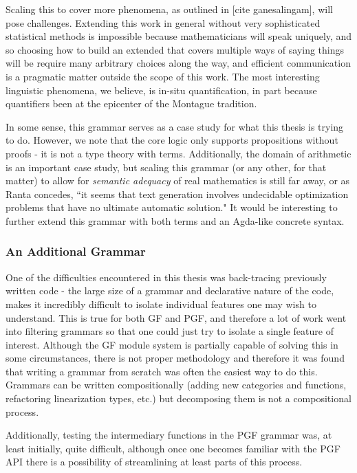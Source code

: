 Scaling this to cover more phenomena, as outlined in [cite ganesalingam], will
pose challenges. Extending this work in general without very sophisticated
statistical methods is impossible because mathematicians will speak uniquely,
and so choosing how to build an extended that covers multiple ways of saying
things will be require many arbitrary choices along the way, and efficient
communication is a pragmatic matter outside the scope of this work. The most
interesting linguistic phenomena, we believe, is in-situ quantification, in part
because quantifiers been at the epicenter of the Montague tradition.

In some sense, this grammar serves as a case study for what this thesis is
trying to do. However, we note that the core logic only supports propositions
without proofs - it is not a type theory with terms. Additionally, the domain of
arithmetic is an important case study, but scaling this grammar (or any other,
for that matter) to allow for \emph{semantic adequacy} of real mathematics is
still far away, or as Ranta concedes, ``it seems that text generation involves
undecidable optimization problems that have no ultimate automatic solution." It
would be interesting to further extend this grammar with both terms and an
Agda-like concrete syntax.

\subsubsection{An Additional Grammar}

One of the difficulties encountered in this thesis was back-tracing previously
written code - the large size of a grammar and declarative nature of the code,
makes it incredibly difficult to isolate individual features one may wish to
understand. This is true for both GF and PGF, and therefore a lot of work went
into filtering grammars so that one could just try to isolate a single feature
of interest. Although the GF module system is partially capable of solving this
in some circumstances, there is not proper methodology and therefore it was
found that writing a grammar from scratch was often the easiest way to do this.
Grammars can be written compositionally (adding new categories and functions, refactoring
linearization types, etc.) but decomposing them is not a compositional process. 

Additionally, testing the intermediary functions in the PGF grammar was, at
least initially, quite difficult, although once one becomes familiar with the
PGF API there is a possibility of streamlining at least parts of this process.


